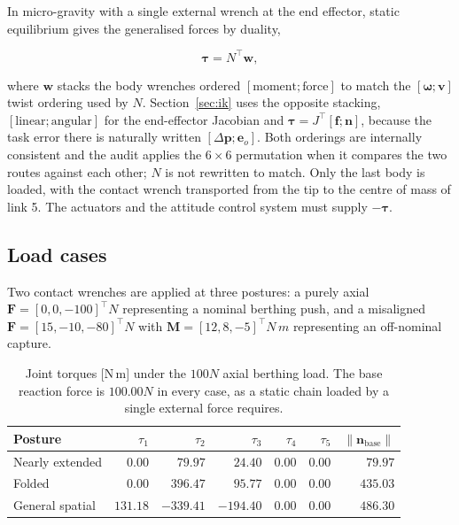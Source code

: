In micro-gravity with a single external wrench at the end effector, static
equilibrium gives the generalised forces by duality,

\begin{equation}
\boldsymbol\tau = N^\top \mathbf w,
\label{eq:duality}
\end{equation}

where $\mathbf w$ stacks the body wrenches ordered $[\text{moment};\text{force}]$
to match the $[\boldsymbol\omega; \mathbf v]$ twist ordering used by $N$.
Section~\ref{sec:ik} uses the opposite stacking, $[\text{linear};\text{angular}]$
for the end-effector Jacobian and $\boldsymbol\tau = J^\top[\mathbf f;\mathbf n]$,
because the task error there is naturally written $[\Delta\mathbf p; \mathbf e_o]$.
Both orderings are internally consistent and the audit applies the $6\times6$
permutation when it compares the two routes against each other; $N$ is not
rewritten to match. Only the last body
is loaded, with the contact wrench transported from the tip to the centre of
mass of link 5. The actuators and the attitude control system must supply
$-\boldsymbol\tau$.

\subsection{Load cases}

Two contact wrenches are applied at three postures: a purely axial
$\mathbf F = [0,0,-100]^\top\unit{N}$ representing a nominal berthing push, and a
misaligned $\mathbf F = [15,-10,-80]^\top\unit{N}$ with
$\mathbf M = [12,8,-5]^\top\unit{N\,m}$ representing an off-nominal capture.

\begin{table}[htbp]
\centering
\caption{Joint torques [N\,m] under the $100\unit{N}$ axial berthing load. The
base reaction force is $100.00\unit{N}$ in every case, as a static chain loaded
by a single external force requires.}
\label{tab:torque1}
\small
\begin{tabular}{lrrrrrr}
\toprule
Posture & $\tau_1$ & $\tau_2$ & $\tau_3$ & $\tau_4$ & $\tau_5$ & $\lVert\mathbf n_{\text{base}}\rVert$ \\
\midrule
Nearly extended & $0.00$   & $79.97$   & $24.40$   & $0.00$  & $0.00$ & $79.97$ \\
Folded          & $0.00$   & $396.47$  & $95.77$   & $0.00$  & $0.00$ & $435.03$ \\
General spatial & $131.18$ & $-339.41$ & $-194.40$ & $0.00$  & $0.00$ & $486.30$ \\
\bottomrule
\end{tabular}
\end{table}


